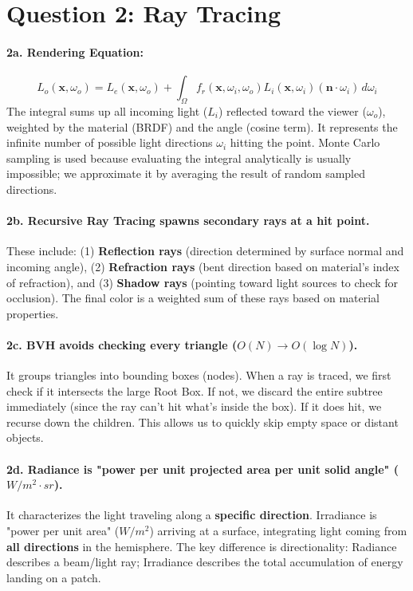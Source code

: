 \documentclass[11pt]{article}
\begin{document}
\section*{Question 2: Ray Tracing}

\paragraph{2a. Rendering Equation:}
\[
L_o(\mathbf{x}, \omega_o) = L_e(\mathbf{x}, \omega_o) + \int_{\Omega} f_r(\mathbf{x}, \omega_i, \omega_o) L_i(\mathbf{x}, \omega_i) (\mathbf{n} \cdot \omega_i) \, d\omega_i
\]
The integral sums up all incoming light ($L_i$) reflected toward the viewer ($\omega_o$), weighted by the material (BRDF) and the angle (cosine term). It represents the infinite number of possible light directions $\omega_i$ hitting the point. Monte Carlo sampling is used because evaluating the integral analytically is usually impossible; we approximate it by averaging the result of random sampled directions.

\paragraph{2b. Recursive Ray Tracing spawns secondary rays at a hit point.} These include: (1) \textbf{Reflection rays} (direction determined by surface normal and incoming angle), (2) \textbf{Refraction rays} (bent direction based on material's index of refraction), and (3) \textbf{Shadow rays} (pointing toward light sources to check for occlusion). The final color is a weighted sum of these rays based on material properties.

\paragraph{2c. BVH avoids checking every triangle ($O(N) \rightarrow O(\log N)$).} It groups triangles into bounding boxes (nodes). When a ray is traced, we first check if it intersects the large Root Box. If not, we discard the entire subtree immediately (since the ray can't hit what's inside the box). If it does hit, we recurse down the children. This allows us to quickly skip empty space or distant objects.

\paragraph{2d. Radiance is "power per unit projected area per unit solid angle" ($W/m^2 \cdot sr$).} It characterizes the light traveling along a \textbf{specific direction}. Irradiance is "power per unit area" ($W/m^2$) arriving at a surface, integrating light coming from \textbf{all directions} in the hemisphere. The key difference is directionality: Radiance describes a beam/light ray; Irradiance describes the total accumulation of energy landing on a patch.
\end{document}
